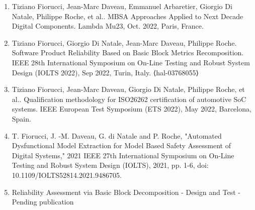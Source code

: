 \documentclass[./dissertation.tex]{subfiles}
\begin{document}
\begin{enumerate}
    \item Tiziano Fiorucci, Jean-Marc Daveau, Emmanuel Arbaretier, Giorgio Di Natale, Philippe Roche, et al.. MBSA Approaches Applied to Next Decade Digital Components. Lambda Mu23, Oct. 2022, Paris, France. 
    \item Tiziano Fiorucci, Giorgio Di Natale, Jean-Marc Daveau, Philippe Roche. Software Product Reliability Based on Basic Block Metrics Recomposition. IEEE 28th International Symposium on On-Line Testing and Robust System Design (IOLTS 2022), Sep 2022, Turin, Italy. ⟨hal-03768055⟩ 
    \item Tiziano Fiorucci, Jean-Marc Daveau, Giorgio Di Natale, Philippe Roche, et al.. Qualification methodology for ISO26262 certification of automotive SoC systems. IEEE European Test Symposium (ETS 2022), May 2022, Barcelona, Spain.
    \item T. Fiorucci, J. -M. Daveau, G. di Natale and P. Roche, "Automated Dysfunctional Model Extraction for Model Based
Safety Assessment of Digital Systems," 2021 IEEE 27th International Symposium on On-Line Testing and Robust
System Design (IOLTS), 2021, pp. 1-6, doi: 10.1109/IOLTS52814.2021.9486705.
    \item Reliability Assessment via Basic Block Decomposition - Design and Test - Pending publication
\end{enumerate}
\newpage	
\end{document}
